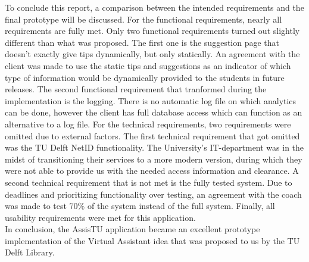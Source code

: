 To conclude this report, a comparison between the intended requirements and the final prototype will be discussed. For the functional requirements, nearly all requirements are fully met. Only two functional requirements turned out slightly different than what was proposed. The first one is the suggestion page that doesn't exactly give tips dynamically, but only statically. An agreement with the client was made to use the static tips and suggestions as an indicator of which type of information would be dynamically provided to the students in future releases. The second functional requirement that tranformed during the implementation is the logging. There is no automatic log file on which analytics can be done, however the client has full database access which can function as an alternative to a log file.
For the technical requirements, two requirements were omitted due to external factors. The first technical requirement that got omitted was the TU Delft NetID functionality. The University's IT-department was in the midst of transitioning their services to a more modern version, during which they were not able to provide us with the needed access information and clearance. A second technical requirement that is not met is the fully tested system. Due to deadlines and prioritizing functionality over testing, an agreement with the coach was made to test 70\% of the system instead of the full system.
Finally, all usability requirements were met for this application. \\

In conclusion, the AssisTU application became an excellent prototype implementation of the Virtual Assistant idea that was proposed to us by the TU Delft Library.
